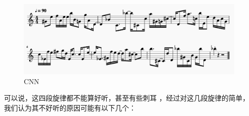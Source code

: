 \documentclass[UTF8,a4paper,10pt]{ctexart}
\begin{document}
\begin{figure}[H]
\begin{center}
	\includegraphics[width=1.0\columnwidth]{output_cnn_melody.png}
	\caption{CNN}
\end{center}
\end{figure}

可以说，这四段旋律都不能算好听，甚至有些刺耳 ，经过对这几段旋律的简单，我们认为其不好听的原因可能有以下几个：
\end{document}
